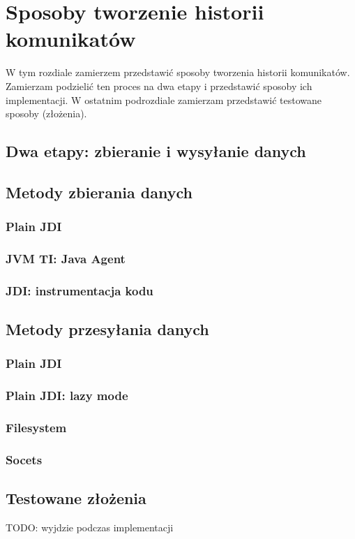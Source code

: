 \chapter{Sposoby tworzenie historii komunikatów}

W tym rozdiale zamierzem przedstawić sposoby tworzenia historii komunikatów. Zamierzam podzielić ten proces na dwa etapy i przedstawić sposoby ich implementacji. W ostatnim podrozdiale zamierzam przedstawić testowane sposoby (złożenia). 

\section{Dwa etapy: zbieranie i wysyłanie danych}

\section{Metody zbierania danych}

\subsection{Plain JDI}

\subsection{JVM TI: Java Agent}

\subsection{JDI: instrumentacja kodu}

\section{Metody przesyłania danych}

\subsection{Plain JDI}

\subsection{Plain JDI: lazy mode}

\subsection{Filesystem}

\subsection{Socets}

\section{Testowane złożenia}

TODO: wyjdzie podczas implementacji
